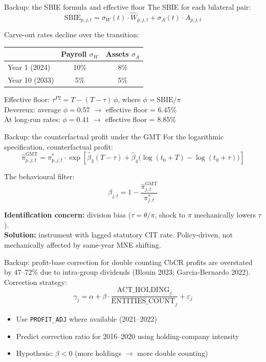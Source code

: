 \documentclass[aspectratio=169, 11pt]{beamer}
\begin{document}
\begin{frame}{Backup: the SBIE formula and effective floor}
The SBIE for each bilateral pair:
$$\text{SBIE}_{p,j,t} = \sigma_W(t) \cdot \hat{W}_{p,j,t} + \sigma_A(t) \cdot A_{p,j,t}$$

Carve-out rates decline over the transition:

\vspace{0.3em}
\begin{center}
\small
\begin{tabular}{@{}lcc@{}}
  \toprule
  & \textbf{Payroll} $\sigma_W$ & \textbf{Assets} $\sigma_A$ \\
  \midrule
  Year 1 (2024) & 10\% & 8\% \\
  Year 10 (2033) & 5\% & 5\% \\
  \bottomrule
\end{tabular}
\end{center}

\vspace{0.4em}
Effective floor: $\tau^{P2} = T - (T - \tau)\,\phi$, where $\phi = \text{SBIE}/\pi$\\[6pt]
Devereux: average $\phi = 0.57$ $\to$ effective floor = 6.45\%\\
At long-run rates: $\phi = 0.41$ $\to$ effective floor = 8.85\%
\end{frame}


\begin{frame}{Backup: the counterfactual profit under the GMT}
For the logarithmic specification, counterfactual profit:
$$\hat{\pi}_{p,j,t}^{\text{GMT}} = \pi_{p,j,t}^{*} \cdot \exp\!\left[\hat{\beta}_3 (T - \tau) + \hat{\beta}_4 \bigl(\log(t_0 + T) - \log(t_0 + \tau)\bigr)\right]$$

The behavioural filter:
$$\beta_{j,t} = 1 - \frac{\hat{\pi}_{j,t}^{\text{GMT}}}{\pi_{j,t}^{*}}$$

\vspace{0.5em}
\textbf{Identification concern:} division bias ($\tau = \theta/\pi$, shock to $\pi$ mechanically lowers $\tau$).\\[4pt]
\textbf{Solution:} instrument with lagged statutory CIT rate. Policy-driven, not mechanically affected by same-year MNE shifting.
\end{frame}


\begin{frame}{Backup: profit-base correction for double counting}
CbCR profits are overstated by 47--72\% due to intra-group dividends (Blouin 2023; Garcia-Bernardo 2022).\\[8pt]

Correction strategy:
$$\gamma_j = \alpha + \beta \cdot \frac{\text{ACT\_HOLDING}_j}{\text{ENTITIES\_COUNT}_j} + \varepsilon_j$$

\begin{itemize}
  \item Use \texttt{PROFIT\_ADJ} where available (2021--2022)
  \item Predict correction ratio for 2016--2020 using holding-company intensity
  \item Hypothesis: $\beta < 0$ (more holdings $\to$ more double counting)
\end{itemize}
\end{frame}
\end{document}
